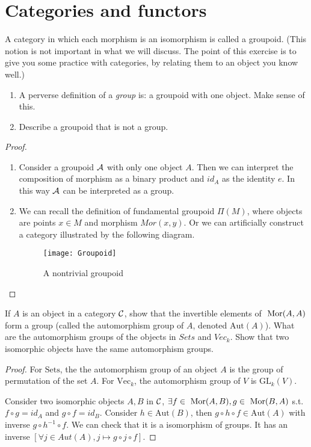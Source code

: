 \documentclass[11pt]{book} %
\begin{document}
\section{Categories and functors}
\begin{exr}
A category in which each morphism is an isomorphism is called a groupoid. (This notion is not important in what we will discuss. The point of this exercise is to give you some practice with categories, by relating them to an object you know well.)
\begin{enumerate}[label=(\alph*)]
\item A perverse definition of a \textit{group} is: a groupoid with one object. Make sense of this.
\item Describe a groupoid that is not a group.
\end{enumerate}
\end{exr}
\begin{proof}\ 
\begin{enumerate}[label=(\alph*)]
\item Consider a groupoid ${\cal A}$ with only one object $A$. Then we can interpret the composition of morphism as a binary product and $id_A$ as the identity $e$. In this way ${\cal A}$ can be interpreted as a group.
\item We can recall the definition of fundamental groupoid $\Pi(M)$, where objects are points $x\in M$ and morphism $Mor(x,y)$. Or we can artificially construct a category illustrated by the following diagram.
\begin{figure}[h]
\centering\texttt{[image: Groupoid]}
\caption{A nontrivial groupoid}
\end{figure}
\end{enumerate}
\end{proof}

\begin{exr}
If $A$ is an object in a category ${\cal C}$, show that the invertible elements of $\text{ Mor}(A, A)$ form a group (called the automorphism group of $A$, denoted $\text{Aut}(A)$). What are the automorphism groups of the objects in $\mathit{Sets}$ and $\mathit{Vec}_k$. Show that two isomorphic objects have the same automorphism groups.
\end{exr}
\begin{proof}
For $\text{Sets}$, the the automorphism group of an object $A$ is the group of permutation of the set $A$. For $\text{Vec}_k$, the automorphism group of $V$ is $\text{GL}_k(V)$. 

Consider two isomorphic objects $A,B$ in ${\cal C}$, $\exists f\in \text{ Mor}(A,B), g\in\text{ Mor}(B,A)$ s.t. $f\circ g=id_A$ and $g\circ f=id_B$. Consider $h\in\text{Aut}(B)$, then $g\circ h\circ f\in \text{Aut}(A)$ with inverse $g\circ h^{-1} \circ f$. We can check that it is a isomorphism of groups. It has an inverse $[\forall j\in Aut(A),j\longmapsto g\circ j\circ f]$.
\end{proof}
\end{document}
